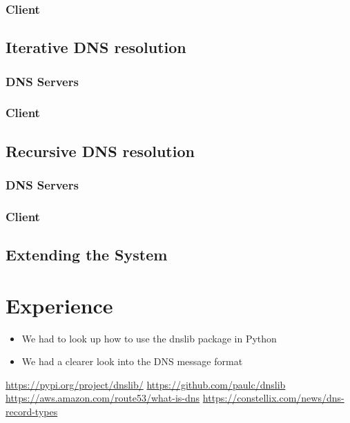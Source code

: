 \documentclass[11pt]{article}
\begin{document}
        \subsubsection*{Client}
    \subsection{Iterative DNS resolution}
        \subsubsection*{DNS Servers}
        \subsubsection*{Client}
    \subsection{Recursive DNS resolution}
        \subsubsection*{DNS Servers}
        \subsubsection*{Client}
    \subsection{Extending the System}


\section{Experience}
    \begin{itemize}
        \item We had to look up how to use the dnslib package in Python
        \item We had a clearer look into the DNS message format
    \end{itemize}

\begin{thebibliography}{1}
     \url{https://pypi.org/project/dnslib/}
     \url{https://github.com/paulc/dnslib}
     \url{https://aws.amazon.com/route53/what-is-dns}
     \url{https://constellix.com/news/dns-record-types}
\end{thebibliography}
\end{document}
